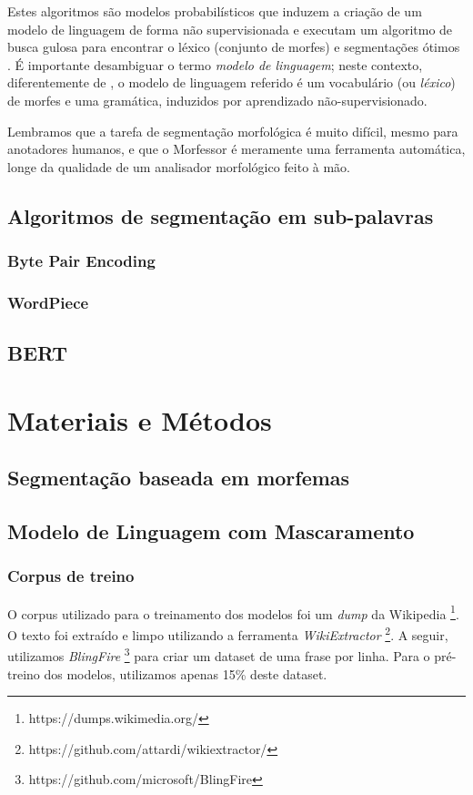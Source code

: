 \documentclass[cic,tc]{iiufrgs}
\begin{document}
Estes algoritmos são modelos probabilísticos que induzem a criação de um modelo de linguagem de forma não supervisionada e executam um algoritmo de busca gulosa para encontrar o léxico (conjunto de morfes) e segmentações ótimos \cite{Creutz05unsupervisedmorpheme}. É importante desambiguar o termo \emph{modelo de linguagem}; neste contexto, diferentemente de \cite{a-neural-probabilistic-lm}, o modelo de linguagem referido é um vocabulário (ou \emph{léxico}) de morfes e uma gramática, induzidos por aprendizado não-supervisionado.

Lembramos que a tarefa de segmentação morfológica é muito difícil, mesmo para anotadores humanos, e que o Morfessor é meramente uma ferramenta automática, longe da qualidade de um analisador morfológico feito à mão.


\section{Algoritmos de segmentação em sub-palavras}
\subsection{Byte Pair Encoding}

\subsection{WordPiece}

\section{BERT}


\chapter{Materiais e Métodos}
\section{Segmentação baseada em morfemas}
\section{Modelo de Linguagem com Mascaramento}
\subsection{Corpus de treino}
O corpus utilizado para o treinamento dos modelos foi um \emph{dump} da Wikipedia \footnote{https://dumps.wikimedia.org/}. O texto foi extraído e limpo utilizando a ferramenta \emph{WikiExtractor} \footnote{https://github.com/attardi/wikiextractor/}. A seguir, utilizamos \emph{BlingFire} \footnote{https://github.com/microsoft/BlingFire} para criar um dataset de uma frase por linha. Para o pré-treino dos modelos, utilizamos apenas 15\% deste dataset.
\end{document}
